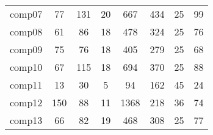 \begin{table}[h!]
\begin{center}
\begin{tabular}{ |c|c|c|c|c|c|c|c| }
comp07                                    & 77                                         & 131                                      & 20                                     & 667                                          & 434                                       & 25                                       & 99                                        \\
comp08                                    & 61                                         & 86                                       & 18                                     & 478                                          & 324                                       & 25                                       & 76                                        \\
comp09                                    & 75                                         & 76                                       & 18                                     & 405                                          & 279                                       & 25                                       & 68                                        \\
comp10                                    & 67                                         & 115                                      & 18                                     & 694                                          & 370                                       & 25                                       & 88                                        \\
comp11                                    & 13                                         & 30                                       & 5                                      & 94                                           & 162                                       & 45                                       & 24                                        \\
comp12                                    & 150                                        & 88                                       & 11                                     & 1368                                         & 218                                       & 36                                       & 74                                        \\
comp13                                    & 66                                         & 82                                       & 19                                     & 468                                          & 308                                       & 25                                       & 77                                        \\

\end{tabular}
\end{center}
\end{table}
